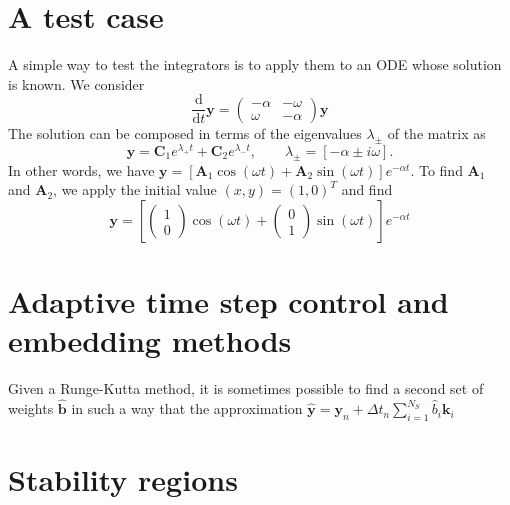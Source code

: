 \documentclass[10pt,a4paper]{article}
\newcommand{\bvec}[1]{\mathbf{#1}}
\newcommand{\dd}[0]{ \mathrm{d} }
\begin{document}
\section{A test case}
A simple way to test the integrators is to apply them to an ODE whose solution is known.
We consider
\begin{equation*}
  \frac{\dd}{\dd t} \bvec{y} = \begin{pmatrix}
    -\alpha & -\omega \\
    \omega & -\alpha \end{pmatrix} \bvec{y}
\end{equation*}
The solution can be composed in terms of the eigenvalues $\lambda_\pm$ of the matrix as
\begin{equation*}
  \bvec{y} = \bvec{C}_1e^{\lambda_+t} + \bvec{C}_2e^{\lambda_-t}, \qquad \lambda_\pm = \left[-\alpha \pm i \omega\right].
\end{equation*}
In other words, we have $\bvec{y} = \left[ \bvec{A}_1\cos(\omega t) + \bvec{A}_2 \sin(\omega t) \right]e^{-\alpha t}.$
To find $\bvec{A}_1$ and $\bvec{A}_2$, we apply the initial value $(x,y) = (1,0)^T$ and find
\begin{equation*}
  \bvec{y} = \left[ \begin{pmatrix} 1 \\ 0 \end{pmatrix} \cos(\omega t) +
  \begin{pmatrix} 0 \\ 1 \end{pmatrix} \sin( \omega t ) \right]e^{-\alpha t}
\end{equation*}

\section{Adaptive time step control and embedding methods}

Given a Runge-Kutta method, it is sometimes possible to find a second set of weights $\hat{\bvec{b}}$ in such a way that the approximation $\hat{\bvec{y}} = \bvec{y}_n + \Delta t_n \sum_{i=1}^{N_S} \hat{b}_i\bvec{k}_i$

\section{Stability regions}
\end{document}

